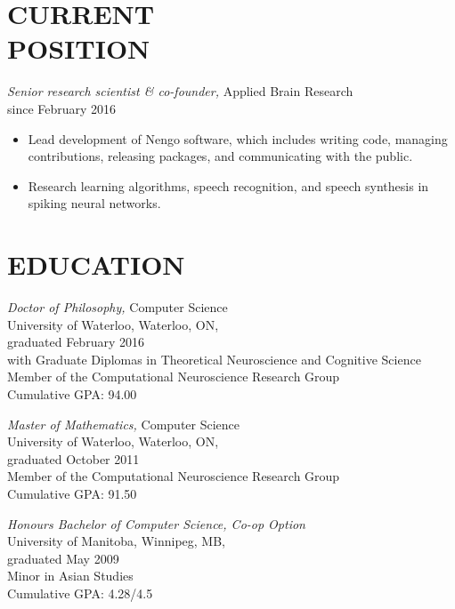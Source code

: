 \documentclass[line,margin]{res}
\begin{document}

\begin{resume}

\section{CURRENT \\ POSITION}

{\sl Senior research scientist \& co-founder,} Applied Brain Research \\
since February 2016
\begin{itemize} \itemsep -2pt
  \item Lead development of Nengo software, which includes
    writing code, managing contributions,
    releasing packages, and communicating with the public.
  \item Research learning algorithms,
    speech recognition, and speech synthesis
    in spiking neural networks.
\end{itemize} \vspace{-4pt}

\section{EDUCATION}

{\sl Doctor of Philosophy,} Computer Science \\
University of Waterloo, Waterloo, ON, \\
graduated February 2016 \\
with Graduate Diplomas in Theoretical Neuroscience and Cognitive Science \\
Member of the Computational Neuroscience Research Group \\
Cumulative GPA: 94.00

{\sl Master of Mathematics,} Computer Science \\
University of Waterloo, Waterloo, ON, \\
graduated October 2011 \\
Member of the Computational Neuroscience Research Group \\
Cumulative GPA: 91.50

{\sl Honours Bachelor of Computer Science, Co-op Option} \\
University of Manitoba, Winnipeg, MB, \\
graduated May 2009 \\
Minor in Asian Studies \\
Cumulative GPA: 4.28/4.5


\end{resume}
\end{document}
